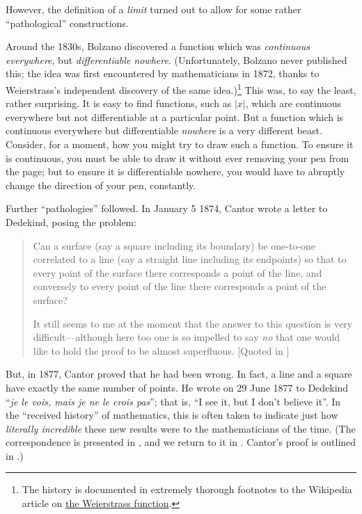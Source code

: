 \documentclass[../../../include/open-logic-section]{subfiles}
\begin{document}

However, the definition of a \emph{limit} turned out to allow for some rather ``pathological'' constructions. 

Around the 1830s, Bolzano discovered a function which was
\emph{continuous everywhere}, but \emph{differentiable nowhere}.
(Unfortunately, Bolzano never published this; the idea was first
encountered by mathematicians in 1872, thanks to Weierstrass's
independent discovery of the same idea.)\footnote{The history is
documented in extremely thorough footnotes to the Wikipedia article on
\href{http://en.wikipedia.org/wiki/Weierstrass_function}{the
Weierstrass function}.} This was, to say the least, rather surprising.
It is easy to find functions, such as $|x|$, which are continuous
everywhere but not differentiable at a particular point. But a
function which is continuous everywhere but differentiable
\emph{nowhere} is a very different beast. Consider, for a moment, how
you might try to draw such a function. To ensure it is continuous, you
must be able to draw it without ever removing your pen from the page;
but to ensure it is differentiable nowhere, you would have to abruptly
change the direction of your pen, constantly.

Further ``pathologies'' followed. In January 5 1874, Cantor wrote a
letter to Dedekind, posing the problem:
\begin{quote}
Can a surface (say a square including its boundary) be one-to-one
correlated to a line (say a straight line including its endpoints) so
that to every point of the surface there corresponds a point of the
line, and conversely to every point of the line there corresponds a
point of the surface?

It still seems to me at the moment that the answer to this question is
very difficult---although here too one is so impelled to say \emph{no}
that one would like to hold the proof to be almost superfluous.
[Quoted in \citealt{Gouvea2011}]
\end{quote}
But, in 1877, Cantor proved that he had been wrong. In fact, a line
and a square have exactly the same number of points. He wrote on 29
June 1877 to Dedekind ``\emph{je le vois, mais je ne le crois pas}'';
that is, ``I see it, but I don't believe it''. In the ``received
history'' of mathematics, this is often taken to indicate just how
\emph{literally incredible} these new results were to the
mathematicians of the time. (The correspondence is presented in
\citet{Gouvea2011}, and we return to it in
. Cantor's proof is outlined in
.) 
\end{document}
